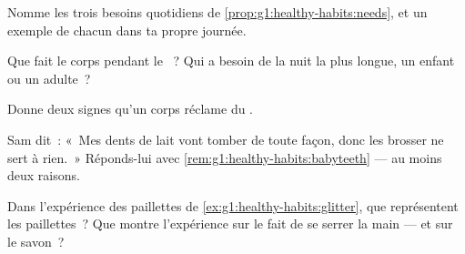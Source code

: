\begin{exercise}[$\star$]\label{exo:g1:healthy-habits:6}
Nomme les trois besoins quotidiens de
\cref{prop:g1:healthy-habits:needs}, et un exemple de chacun dans ta
propre journée.
\end{exercise}

\begin{exercise}[$\star$]\label{exo:g1:healthy-habits:7}
Que fait le corps pendant le ~? Qui a besoin de la nuit la
plus longue, un enfant ou un adulte~?
\end{exercise}

\begin{exercise}[$\star$]\label{exo:g1:healthy-habits:8}
Donne deux signes qu'un corps réclame du .
\end{exercise}

\begin{exercise}[$\star\star$]\label{exo:g1:healthy-habits:9}
Sam dit~: «~Mes dents de lait vont tomber de toute façon, donc les
brosser ne sert à rien.~» Réponds-lui avec
\cref{rem:g1:healthy-habits:babyteeth} --- au moins deux raisons.
\end{exercise}

\begin{exercise}[$\star\star$]\label{exo:g1:healthy-habits:10}
Dans l'expérience des paillettes de
\cref{ex:g1:healthy-habits:glitter}, que représentent les
paillettes~? Que montre l'expérience sur le fait de se serrer la
main --- et sur le savon~?
\end{exercise}

